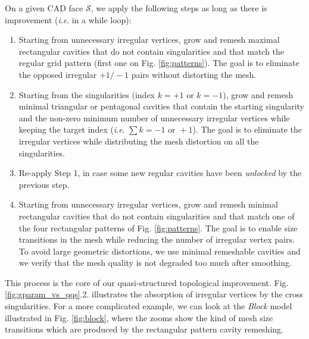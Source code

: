 \documentclass[AMA,STIX1COL]{WileyNJD-v2}
\newcommand{\surface}{\ensuremath{\mathcal{S}}}
\newcommand{\ie}{\textit{i}.\textit{e}. }
\newcommand\rfig[1]{Fig. \ref{#1}}
\begin{document}
{On a given CAD face $\surface$, we apply the following steps as long as
there is improvement (\ie in a while loop):
\begin{enumerate}
    \item Starting from unnecessary irregular vertices, grow and remesh maximal
        rectangular cavities that do not contain singularities and that match
        the regular grid pattern (first one on \rfig{fig:patterns}).  The goal
        is to eliminate the opposed irregular $+1/-1$ pairs without distorting
        the mesh.
    \item Starting from the singularities (index $k=+1$ or $k=-1$), grow and
        remesh minimal triangular or pentagonal cavities that contain the
        starting singularity and the non-zero minimum number of unnecessary
        irregular vertices while keeping the target index (\ie $\sum k = -1
        \text{ or } +1$). The goal is to eliminate the irregular vertices
        while distributing the mesh distortion on all the singularities.
    \item Re-apply Step 1, in case some new regular cavities have been \emph{unlocked} by
        the previous step.
    \item Starting from unnecessary irregular vertices, grow and remesh
        minimal rectangular cavities that do not contain singularities
        and that match one of the four rectangular patterns of \rfig{fig:patterns}.
        The goal is to enable size transitions in the mesh while reducing
        the number of irregular vertex pairs. To avoid large geometric distortions,
        we use minimal remeshable cavities and we verify that the mesh quality
        is not degraded too much after smoothing.
\end{enumerate}


This process is the core of our quasi-structured topological improvement.
\rfig{fig:gparam_vs_qqs}.2. illustrates the absorption of irregular
vertices by the cross singularities. For a more complicated example,
we can look at the \emph{Block} model illustrated in \rfig{fig:block},
where the zooms show the kind of mesh size transitions which are produced by
the rectangular pattern cavity remeshing.


}
\end{document}
